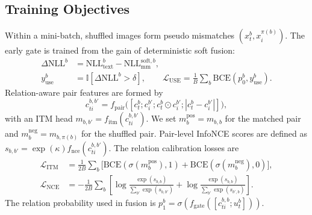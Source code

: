 \documentclass{llncs}
\newcommand{\Litm}{\mathcal{L}_{\mathrm{ITM}}}
\newcommand{\Lnce}{\mathcal{L}_{\mathrm{NCE}}}
\newcommand{\Luse}{\mathcal{L}_{\mathrm{USE}}} %
\newcommand{\BCE}{\mathrm{BCE}}
\begin{document}
\subsection{Training Objectives}\label{sec:train}
Within a mini-batch, shuffled images form pseudo mismatches $(x_t^b,x_i^{\pi(b)})$. The early gate is trained from the gain of deterministic soft fusion:
\begin{align}
\Delta \mathrm{NLL}^b&=\mathrm{NLL}_{\mathrm{text}}^b-\mathrm{NLL}_{\mathrm{mm}}^{\mathrm{soft},b},\\
y_{\mathrm{use}}^b&=\mathbb{I}[\Delta \mathrm{NLL}^b>\delta],\qquad
\Luse=\tfrac{1}{B}\sum_b\BCE(p_0^b,y_{\mathrm{use}}^b).
\end{align}
Relation-aware pair features are formed by
\begin{equation}
c_{ti}^{b,b'}=f_{\mathrm{pair}}\!\big([c_t^b;c_i^{b'};c_t^b\odot c_i^{b'};|c_t^b-c_i^{b'}|]\big),
\end{equation}
with an ITM head $m_{b,b'}=f_{\mathrm{itm}}(c_{ti}^{b,b'})$. We set $m_b^{\mathrm{pos}}=m_{b,b}$ for the matched pair and $m_b^{\mathrm{neg}}=m_{b,\pi(b)}$ for the shuffled pair. Pair-level InfoNCE scores are defined as $s_{b,b'}=\exp(\kappa)f_{\mathrm{nce}}(c_{ti}^{b,b'})$. The relation calibration losses are
\begin{align}
\Litm &= \tfrac{1}{2B}\sum_b\!\big[\BCE(\sigma(m_b^{\mathrm{pos}}),1)+\BCE(\sigma(m_b^{\mathrm{neg}}),0)\big],\\
\Lnce &= -\tfrac{1}{2B}\sum_b\!\left[
\log\frac{\exp(s_{b,b})}{\sum_{b'}\exp(s_{b,b'})}
+\log\frac{\exp(s_{b,b})}{\sum_{b'}\exp(s_{b',b})}
\right].
\end{align}
The relation probability used in fusion is $p_1^b=\sigma(f_{\mathrm{gate}}([c_{ti}^{b,b};u_t^b]))$.
\end{document}

